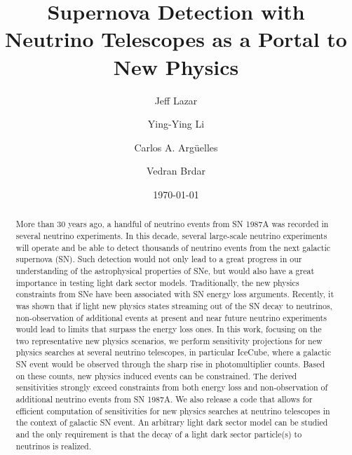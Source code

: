 
\title{Supernova Detection with Neutrino Telescopes as a Portal to New Physics}

\author{Jeff Lazar}
\author{Ying-Ying Li}
\author{Carlos A. Arg\"{u}elles}
\author{Vedran Brdar}

\date{\today}

\begin{abstract}
More than 30 years ago, a handful of neutrino events from SN 1987A was recorded in several 
neutrino experiments. In this decade, several large-scale neutrino experiments will operate and be able to detect thousands of neutrino events from the next galactic supernova (SN). Such detection would not only lead to a great progress in our understanding of the astrophysical properties of SNe, but would also have a great importance in testing light dark sector models. Traditionally, the new physics constraints from SNe have been associated with SN energy loss arguments. Recently, it was shown that if light new physics states streaming out of the SN decay to neutrinos, non-observation of additional events at present and near future neutrino experiments would lead to limits that surpass the energy loss ones. In this work, focusing on the two representative new physics scenarios, we perform sensitivity projections for new physics searches at several neutrino telescopes, in particular IceCube, where a galactic SN event would be observed through the sharp rise in  photomultiplier counts. Based on these counts, new physics induced events can be constrained. The derived sensitivities strongly exceed constraints from both energy loss and non-observation of additional neutrino events from SN 1987A. We also release a code that allows for efficient computation of sensitivities for new physics searches at neutrino telescopes in the context of galactic SN event. An arbitrary light dark sector model can be studied and the only requirement is that the decay of a light dark sector particle(s) to neutrinos is realized.      
\end{abstract}

\maketitle